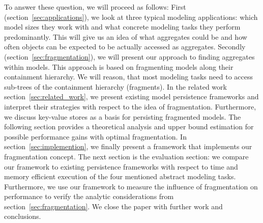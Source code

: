 To answer these question, we will proceed as follows: First (section~\ref{sec:applications}), we look at three typical modeling applications: which model sizes they work with and what concrete modeling tasks they perform predominantly. This will give us an idea of what aggregates could be and how often objects can be expected to be actually accessed as aggregates. 
Secondly (section~\ref{sec:fragmentation}), we will present our approach to finding aggregates within models. This approach is based on fragmenting models along their containment hierarchy. We will reason, that most modeling tasks need to access sub-trees of the containment hierarchy (fragments). 
In the related work section~\ref{sec:related_work}, we present existing model persistence frameworks and interpret their strategies with respect to the idea of fragmentation. Furthermore, we discuss key-value stores as a basis for persisting fragmented models.
The following section provides a theoretical analysis and upper bound estimation for possible performance gains with optimal fragmentation.
In section~\ref{sec:implemention}, we finally present a framework that implements our fragmentation concept.
The next section is the evaluation section: we compare our framework to existing persistence frameworks with respect to time and memory efficient execution of the four mentioned abstract modeling tasks. Furthermore, we use our framework to measure the influence of fragmentation on performance to verify the analytic considerations from section~\ref{sec:fragmentation}.
We close the paper with further work and conclusions. 

